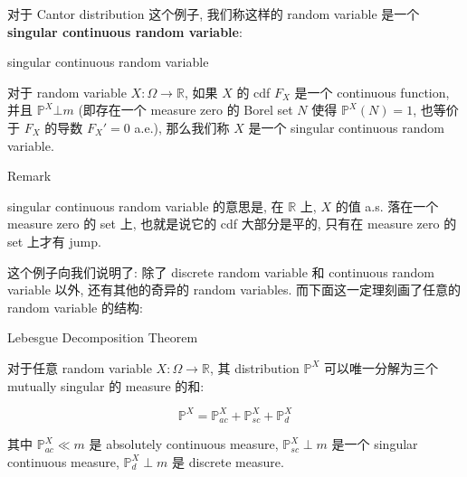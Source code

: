\documentclass{qlnotes-export}
\begin{document}
对于 Cantor distribution 这个例子, 我们称这样的 random variable 是一个 \textbf{singular continuous random variable}:

\begin{definition}{singular continuous random variable}\label{def-02-random-variables-singular-continuous-random-variable}

对于 random variable \(X:\Omega\rightarrow{\mathbb{R}}\), 如果 \(X\) 的 cdf \(F_{X}\) 是一个 continuous function, 并且 \({\mathbb{P}}^{X}\bot m\) (即存在一个 measure zero 的 Borel set \(N\) 使得 \({\mathbb{P}}^{X}(N) = 1\), 也等价于 \(F_{X}\) 的导数 \(F_{X}' = 0\) a.e.), 那么我们称 \(X\) 是一个 singular continuous random variable.

\end{definition}

\begin{qlremark}{Remark}

singular continuous random variable 的意思是, 在 \(\mathbb{R}\) 上, \(X\) 的值 a.s. 落在一个 measure zero 的 set 上, 也就是说它的 cdf 大部分是平的, 只有在 measure zero 的 set 上才有 jump.

\end{qlremark}

这个例子向我们说明了: 除了 discrete random variable 和 continuous random variable 以外, 还有其他的奇异的 random variables. 而下面这一定理刻画了任意的 random variable 的结构:

\begin{theorem}{Lebesgue Decomposition Theorem}\label{thm-02-random-variables-lebesgue-decomposition-theorem}

对于任意 random variable \(X:\Omega\rightarrow{\mathbb{R}}\), 其 distribution \({\mathbb{P}}^{X}\) 可以唯一分解为三个 mutually singular 的 measure 的和:

\[{\mathbb{P}}^{X} = {\mathbb{P}}_{ac}^{X} + {\mathbb{P}}_{sc}^{X} + {\mathbb{P}}_{d}^{X}\]

其中 \({\mathbb{P}}_{ac}^{X} \ll m\) 是 absolutely continuous measure, \({\mathbb{P}}_{sc}^{X} \perp m\) 是一个 singular continuous measure, \({\mathbb{P}}_{d}^{X} \perp m\) 是 discrete measure.

\end{theorem}
\end{document}
